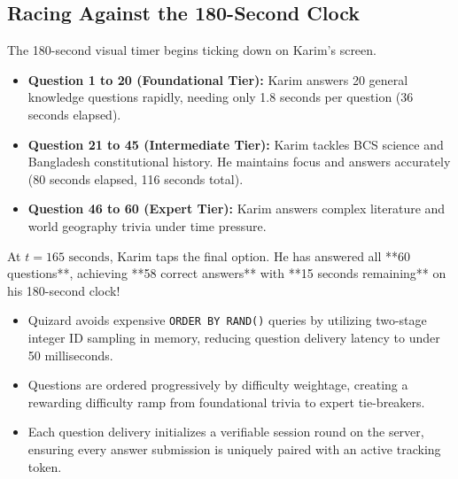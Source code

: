 \subsection{Racing Against the 180-Second Clock}
The 180-second visual timer begins ticking down on Karim's screen. 

\begin{itemize}
    \item \textbf{Question 1 to 20 (Foundational Tier):} Karim answers 20 general knowledge questions rapidly, needing only 1.8 seconds per question (36 seconds elapsed).
    \item \textbf{Question 21 to 45 (Intermediate Tier):} Karim tackles BCS science and Bangladesh constitutional history. He maintains focus and answers accurately (80 seconds elapsed, 116 seconds total).
    \item \textbf{Question 46 to 60 (Expert Tier):} Karim answers complex literature and world geography trivia under time pressure.
\end{itemize}

At $t = 165\text{ seconds}$, Karim taps the final option. He has answered all **60 questions**, achieving **58 correct answers** with **15 seconds remaining** on his 180-second clock!

\begin{tcolorbox}[summarybox, title={Chapter Key Takeaways}]
\begin{itemize}
    \item Quizard avoids expensive \texttt{ORDER BY RAND()} queries by utilizing two-stage integer ID sampling in memory, reducing question delivery latency to under 50 milliseconds.
    \item Questions are ordered progressively by difficulty weightage, creating a rewarding difficulty ramp from foundational trivia to expert tie-breakers.
    \item Each question delivery initializes a verifiable session round on the server, ensuring every answer submission is uniquely paired with an active tracking token.
\end{itemize}
\end{tcolorbox}
